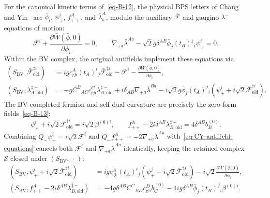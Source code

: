 \documentclass[11pt]{article}
\numberwithin{equation}{section}
\numberwithin{figure}{section}
\numberwithin{table}{section}
\begin{document}
For the canonical kinetic terms of~\eqref{eq-B-12}, the physical BPS letters of Chang and Yin~\cite[Section 2]{ChangYin} are $\bar\phi_i$, $\psi_+^i$, $f_{++}^A$, and $\bar\lambda_{\dot a}^A$, modulo the auxiliary $\bar{\mathcal F}$ and gaugino $\lambda^-$ equations of motion:
\begin{equation}\label{eq-CY-component-equations}
\mathcal F^i+\frac{\partial\bar W(\bar\phi,0)}{\partial\bar\phi_i}=0,
\qquad
\nabla_{+\dot a}\bar\lambda^{A\dot a}
-\sqrt2g\delta^{AB}\bar\phi_j(t_B)^j{}_i\psi_+^i=0.
\end{equation}
Within the BV complex, the original antifields implement these equations via
\begin{equation}\label{eq-CY-antifield-equations}
\begin{aligned}
(S_{\mathrm{BV}},\bar{\mathcal F}_{\mathrm{old}}^{\ddagger i})
&=igc_{\mathrm{gh}}^A(t_A)^i{}_j\bar{\mathcal F}_{\mathrm{old}}^{\ddagger j}
-\mathcal F^i-\frac{\partial\bar W(\bar\phi,0)}{\partial\bar\phi_i},\\
(S_{\mathrm{BV}},\lambda_{A,\mathrm{old}}^{\ddagger-})
&=-gC^B{}_{AC}c_{\mathrm{gh}}^C\lambda_{B,\mathrm{old}}^{\ddagger-}
+i\delta_{AB}\nabla_{+\dot a}\bar\lambda^{B\dot a}
-i\sqrt2g\bar\phi_j(t_A)^j{}_i
 \left(\psi_+^i+i\sqrt2\bar{\mathcal F}_{\mathrm{old}}^{\ddagger i}\right).
\end{aligned}
\end{equation}
The BV-completed fermion and self-dual curvature are precisely the zero-form fields~\eqref{eq-B-13}:
\begin{equation}\label{eq-CY-completed-letters}
\psi_+^i+i\sqrt2\bar{\mathcal F}_{\mathrm{old}}^{\ddagger i}
=i\sqrt2\beta^{(0)i},\qquad
f_{++}^A-2i\delta^{AB}\lambda_{B,\mathrm{old}}^{\ddagger-}
=4\delta^{AB}b_B^{(0)}.
\end{equation}
Combining $Q_-\psi_+^i=i\sqrt2\mathcal F^i$ and $Q_-f_{++}^A=-2\nabla_{+\dot a}\bar\lambda^{A\dot a}$ with~\eqref{eq-CY-antifield-equations} cancels both $\mathcal F^i$ and $\nabla_{+\dot a}\bar\lambda^{A\dot a}$ identically, keeping the retained complex $\mathcal S$ closed under $(S_{\mathrm{BV}},\,\cdot\,)$:
\begin{equation}\label{eq-CY-completion-images}
\begin{aligned}
(S_{\mathrm{BV}},
 \psi_+^i+i\sqrt2\bar{\mathcal F}_{\mathrm{old}}^{\ddagger i})
&=igc_{\mathrm{gh}}^A(t_A)^i{}_j\left(\psi_+^j+i\sqrt2\bar{\mathcal F}_{\mathrm{old}}^{\ddagger j}\right)
-i\sqrt2\frac{\partial\bar W(\bar\phi,0)}{\partial\bar\phi_i},\\
(S_{\mathrm{BV}},f_{++}^A-2i\delta^{AB}\lambda_{B,\mathrm{old}}^{\ddagger-})
&=-4g\delta^{AB}C^C{}_{BD}c_{\mathrm{gh}}^Db_C^{(0)}
-4ig\delta^{AB}\bar\phi_j(t_B)^j{}_i\beta^{(0)i}.
\end{aligned}
\end{equation}
\end{document}
